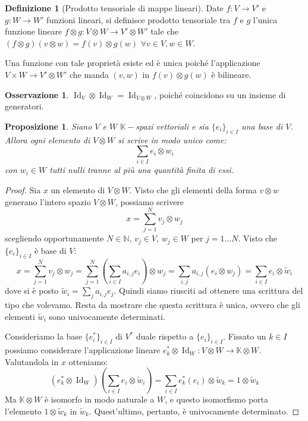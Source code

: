 \documentclass[11pt]{article}
\theoremstyle{plain}
\newtheorem{prop}[thm]{Proposizione}
\theoremstyle{definition}
\newtheorem{defn}{Definizione}[section]
\newtheorem*{rem}{Osservazione}
\theoremstyle{remark}
\newcommand{\K}{\mathbb{K}}
\newcommand{\N}{\mathbb{N}}
\DeclareMathOperator{\Id}{Id}
\begin{document}
\begin{defn}[Prodotto tensoriale di mappe lineari]
Date $f:V \to V'$ e $g:W \to W'$ funzioni lineari, si definisce prodotto tensoriale tra $f$ e $g$ l'unica funzione lineare $f \otimes g : V \otimes W \to V' \otimes W'$ tale che $(f \otimes g)(v \otimes w)=f(v) \otimes g(w)$ $\forall v\in V, w\in W$.

Una funzione con tale proprietà esiste ed è unica poiché l'applicazione $V\times W \to V'\otimes W'$ che manda $(v,w)$ in $f(v)\otimes g(w)$ è bilineare.
\end{defn}

\begin{rem}
$\Id_V \otimes \Id_W = \Id_{V\otimes W}$, poiché coincidono su un insieme di generatori.
\end{rem}


\begin{prop}
Siano $V$ e $W$ $\K-$spazi vettoriali e sia $\{e_i\}_{i\in I}$ una base di $V$. Allora ogni elemento di $V\otimes W$ si scrive in modo unico come:
\[ \sum_{i\in I} e_i \otimes w_i\]
con $w_i\in W$ tutti nulli tranne al più una quantità finita di essi.
\end{prop}
\begin{proof}
Sia $x$ un elemento di $V\otimes W$.
Visto che gli elementi della forma $v\otimes w$ generano l'intero spazio $V\otimes W$, possiamo scrivere
\[ x = \sum_{j=1}^N v_j\otimes w_j \]
scegliendo opportunamente $N\in \N$, $v_j\in V$, $w_j\in W$ per $j=1\dots N$. Visto che $\{e_i\}_{i\in I}$ è base di $V$:
\[ x = \sum_{j=1}^N v_j\otimes w_j  = \sum_{j=1}^N \left(\sum_{i\in I} a_{i,j}e_i\right)\otimes w_j = \sum_{i,j} a_{i,j}(e_i\otimes w_j) = \sum_{i\in I} e_i\otimes\tilde w_i\]
dove si è posto $\tilde w_i = \sum_j a_{i,j}e_j$.
Quindi siamo riusciti ad ottenere una scrittura del tipo che volevamo. Resta da mostrare che questa scrittura è unica,
ovvero che gli elementi $\tilde w_i$ sono univocamente determinati.

Consideriamo la base $\{e_i^*\}_{i\in I}$ di $V^*$ duale rispetto a $\{e_i\}_{i\in I}$. Fissato un $k\in I$ possiamo considerare l'applicazione
lineare $e_k^*\otimes \Id_W: V\otimes W \to \K\otimes W$. Valutandola in $x$ otteniamo:
\[ (e_k^*\otimes \Id_W) \left(\sum_{i\in I} e_i\otimes\tilde w_i \right) = \sum_{i\in I} e_k^*(e_i)\otimes\tilde w_k = 1\otimes \tilde w_k\]
Ma $\K\otimes W$ è isomorfo in modo naturale a $W$, e questo isomorfismo porta l'elemento $1\otimes \tilde w_k$ in $\tilde w_k$.
Quest'ultimo, pertanto, è univocamente determinato.
\end{proof}
\end{document}
